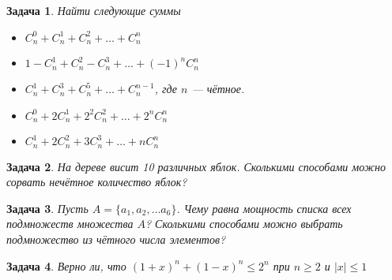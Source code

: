 \documentclass[12pt, a4paper]{article}
\newtheorem{problem}{Задача}
\begin{document}
\begin{problem}
Найти следующие суммы
\begin{itemize}
\item $C_n^0 + C_n^1 + C_n^2 + \ldots + C_n^n$
\item $1 - C_n^1 + C_n^2 - C_n^3 + \ldots + (-1)^n C_n^n$
\item $C_n^1 + C_n^3 + C_n^5 + \ldots + C_n^{n-1}$, где $n$ --- чётное.
\item $C_n^0 + 2C_n^1 + 2^2 C_n^2 + \ldots + 2^n C_n^n$
\item $C_n^1 + 2C_n^2 + 3C_n^3 + \ldots + n C_n^n$
\end{itemize}
\begin{sol}

\end{sol}
\end{problem}



\begin{problem}
На дереве висит 10 различных яблок. Сколькими способами можно сорвать нечётное количество яблок?
\begin{sol}

\end{sol}
\end{problem}



\begin{problem}
Пусть $A = \{a_1,a_2, \ldots a_6\}$. Чему равна мощность списка всех подмножеств множества $A$?  Сколькими способами можно 
выбрать подмножество из чётного числа элементов?
\begin{sol}

\end{sol}
\end{problem}



\begin{problem}
Верно ли, что $(1 + x)^n + (1 - x)^n \le 2^n$ при $ n \ge 2$ и $|x| \le 1$ 
\begin{sol}

\end{sol}
\end{problem}





% 
\end{document}

